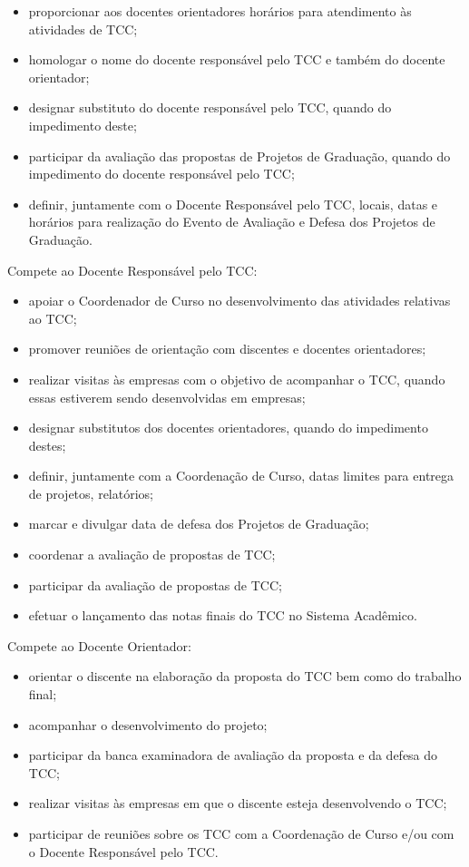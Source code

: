\begin{itemize}
	\item proporcionar aos docentes orientadores horários para atendimento às atividades de TCC; 

	\item homologar o nome do docente responsável pelo TCC e também do docente orientador; 

	\item designar substituto do docente responsável pelo TCC, quando do impedimento deste; 

	\item participar da avaliação das propostas de Projetos de Graduação, quando do impedimento do docente responsável pelo TCC; 

	\item definir, juntamente com o Docente Responsável pelo TCC, locais, datas e horários para realização do Evento de Avaliação e Defesa dos Projetos de Graduação. 
\end{itemize}

Compete ao Docente Responsável pelo TCC: 
\begin{itemize}
	\item apoiar o Coordenador de Curso no desenvolvimento das atividades relativas ao TCC; 
	\item promover reuniões de orientação com discentes e docentes orientadores; 
	\item realizar visitas às empresas com o objetivo de acompanhar o TCC, quando essas estiverem sendo desenvolvidas em empresas;
	\item designar substitutos dos docentes orientadores, quando do impedimento destes; 
	\item definir, juntamente com a Coordenação de Curso, datas limites para entrega de projetos, relatórios; 
	\item marcar e divulgar data de defesa dos Projetos de Graduação; 
	\item coordenar a avaliação de propostas de TCC; 
	\item participar da avaliação de propostas de TCC; 
	\item efetuar o lançamento das notas finais do TCC no Sistema Acadêmico. 
\end{itemize}

Compete ao Docente Orientador: 
\begin{itemize}
	\item orientar o discente na elaboração da proposta do TCC bem como do trabalho final; 

	\item acompanhar o desenvolvimento do projeto;

	\item participar da banca examinadora de avaliação da proposta e da defesa do TCC; 

	\item realizar visitas às empresas em que o discente esteja desenvolvendo o TCC; 

	\item participar de reuniões sobre os TCC com a Coordenação de Curso e/ou com o Docente Responsável pelo TCC. 
\end{itemize}

